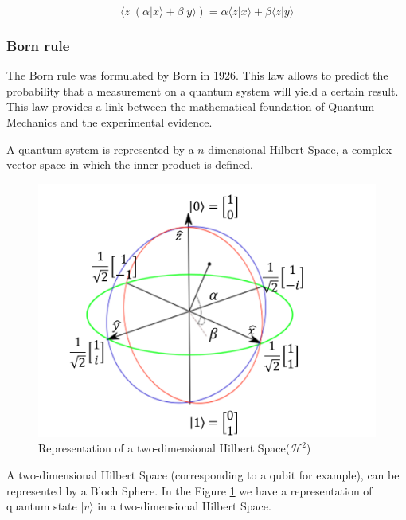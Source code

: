  

\begin{equation}
\label{eq_linearity}
\langle z\vert(\alpha\vert x\rangle+\beta\vert y\rangle)=\alpha\langle z\vert x\rangle+\beta\langle z\vert y\rangle
\end{equation}


\subsubsection{Born rule}

The Born rule was formulated by Born in 1926. This law allows to predict the probability that a measurement on a quantum system will yield a certain result. This law provides a link between the mathematical foundation of Quantum Mechanics and the experimental evidence\cite{VanRijsbergen2004}\cite{Landsman2009}. 

A quantum system is represented by a $n$-dimensional Hilbert Space, a complex vector space in which the inner product is defined. 




\begin{figure}[h]
\centering 

\includegraphics[scale=0.35]{Figures/bloch_sphere.png}
\caption{Representation of a two-dimensional Hilbert Space($\mathcal{H}^{2}$)}
\label{fig:circle}
\end{figure}


A two-dimensional Hilbert Space (corresponding to a qubit for example), can be represented by a Bloch Sphere. In the Figure \ref{fig:circle} we have a representation of quantum state $\vert v \rangle$ in a two-dimensional Hilbert Space. 



